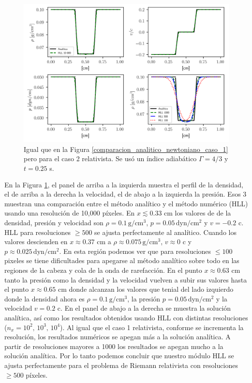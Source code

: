 \documentclass[12pt,a4paper]{book}
\begin{document}
\begin{figure}
  \centering
    \includegraphics[width=1.0\textwidth]{./Figuras/verificacion_del_codigo/caso_relativista/caso_rel_rar_rar.png}
  \caption{Igual que en la Figura \ref{comparacion_analitico_newtoniano_caso_1} pero para el caso 2 
  relativista. Se usó un índice adiabático $\Gamma = 4/3$ y $t = 0.25$ s.
  } \label{caso_rel_shock_shock_2}
\end{figure}

En la Figura \ref{caso_rel_shock_shock_2}, el panel de arriba a la izquierda muestra el perfil de la 
densidad, el de arriba a la derecha la velocidad, el de abajo a la izquierda la presión. Esos 3 muestran
una comparación entre el método analítico y el método numérico (HLL) usando una resolución de 
10,000 píxeles. 
En $x \lesssim 0.33$ cm los valores de de la densidad, presión y velocidad son 
$\rho = 0.1 \,  \text{g}/ \text{cm}^3$, $p = 0.05 \,  \text{dyn}/ \text{cm}^2 $
y $v = -0.2$ c. HLL para resoluciones $\geq 500$ se ajusta perfectamente al analítico. Cuando los 
valores descienden en $x \approx 0.37$ cm a $\rho \approx 0.075 \,  \text{g}/ \text{cm}^3$, 
$v \approx 0$ c y $p \approx 0.025\,  \text{dyn}/ \text{cm}^2 $. En
esta región podemos ver que para resoluciones $\leq 100$ pixeles se tiene dificultades para apegarse al
método analítico sobre todo en las regiones de la cabeza y cola de la onda de rarefacción. En el punto $x \approx 0.63$  cm tanto la presión como la densidad y la velocidad vuelven a subir
sus valores hasta el punto $x \approx 0.65$ cm donde alcanzan los valores que tenial del lado izquierdo
donde la densidad ahora es $\rho = 0.1 \,  \text{g}/ \text{cm}^3$, la presión $p = 0.05 \,  \text{dyn}/ \text{cm}^2 $ 
y la velocidad $v = 0.2$ c.
En el panel de abajo a la derecha se muestra la solución analítica, así como los resultados obtenidos 
usando HLL con distintas resoluciones ($n_x = 10^2, \, 10^3, \,10^4$). 
Al igual que el caso 1 relativista,
conforme se incrementa la resolución, los resultados numéricos se apegan más a la solución analítica.
A partir de resoluciones mayores a 1000 los resultados se apegan mucho a la solución analítica.
Por lo tanto podemos concluir que nuestro módulo HLL se ajusta perfectamente para el problema de 
Riemann relativista con resoluciones $\geq 500$ píxeles.
\end{document}

